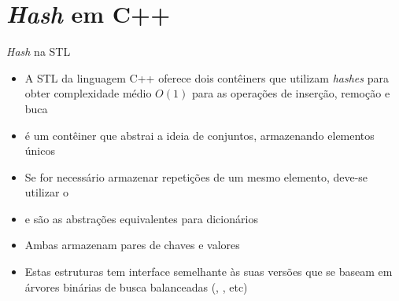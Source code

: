 \section{{\it Hash} em C++}

\begin{frame}[fragile]{{\it Hash} na STL}

    \begin{itemize}
        \item A STL da linguagem C++ oferece dois contêiners que utilizam \textit{hashes}
            para obter complexidade médio $O(1)$ para as operações de inserção, remoção e
            buca

        \item {} é um contêiner que abstrai a ideia de conjuntos,
            armazenando elementos únicos

        \item Se for necessário armazenar repetições de um mesmo elemento, deve-se utilizar o

        \item {} e  são as abstrações
            equivalentes para dicionários

        \item Ambas armazenam pares de chaves e valores

        \item Estas estruturas tem interface semelhante às suas versões que se baseam em
            árvores binárias de busca balanceadas (, , etc)
    \end{itemize}

\end{frame}

